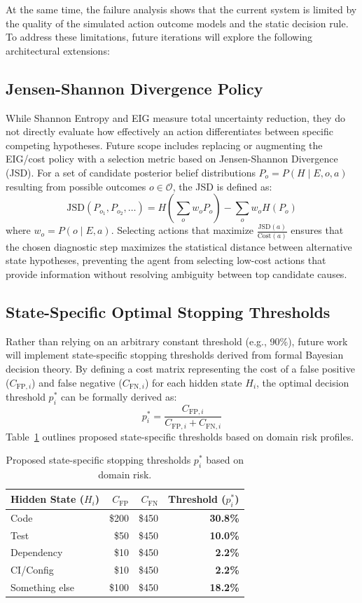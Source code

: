 \documentclass{article}
\begin{document}
At the same time, the failure analysis shows that the current system is limited by the quality of the simulated action outcome models and the static decision rule. To address these limitations, future iterations will explore the following architectural extensions:

\subsection{Jensen-Shannon Divergence Policy}
While Shannon Entropy and EIG measure total uncertainty reduction, they do not directly evaluate how effectively an action differentiates between specific competing hypotheses. Future scope includes replacing or augmenting the EIG/cost policy with a selection metric based on Jensen-Shannon Divergence (JSD). For a set of candidate posterior belief distributions $P_o = P(H \mid E, o, a)$ resulting from possible outcomes $o \in \mathcal{O}$, the JSD is defined as:
\[
\text{JSD}(P_{o_1}, P_{o_2}, \dots) = H\left(\sum_{o} w_o P_o\right) - \sum_{o} w_o H(P_o)
\]
where $w_o = P(o \mid E, a)$. Selecting actions that maximize $\frac{\text{JSD}(a)}{\text{Cost}(a)}$ ensures that the chosen diagnostic step maximizes the statistical distance between alternative state hypotheses, preventing the agent from selecting low-cost actions that provide information without resolving ambiguity between top candidate causes.

\subsection{State-Specific Optimal Stopping Thresholds}
Rather than relying on an arbitrary constant threshold (e.g., 90\%), future work will implement state-specific stopping thresholds derived from formal Bayesian decision theory. By defining a cost matrix representing the cost of a false positive ($C_{\text{FP}, i}$) and false negative ($C_{\text{FN}, i}$) for each hidden state $H_i$, the optimal decision threshold $p^*_i$ can be formally derived as:
\[
p^*_i = \frac{C_{\text{FP}, i}}{C_{\text{FP}, i} + C_{\text{FN}, i}}
\]
Table~\ref{tab:thresholds} outlines proposed state-specific thresholds based on domain risk profiles.

\begin{table}[t]
\centering
\caption{Proposed state-specific stopping thresholds $p^*_i$ based on domain risk.}
\label{tab:thresholds}
\begin{tabular}{lrrr}
\toprule
Hidden State ($H_i$) & $C_{\text{FP}}$ & $C_{\text{FN}}$ & Threshold ($p^*_i$) \\
\midrule
Code & \$200 & \$450 & \textbf{30.8\%} \\
Test & \$50 & \$450 & \textbf{10.0\%} \\
Dependency & \$10 & \$450 & \textbf{2.2\%} \\
CI/Config & \$10 & \$450 & \textbf{2.2\%} \\
Something else & \$100 & \$450 & \textbf{18.2\%} \\
\bottomrule
\end{tabular}
\end{table}
\end{document}

